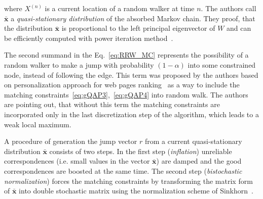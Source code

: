 where $X^{(n)}$ is a current location of a random walker at time $n$. The authors call $\mathbf{\bar{x}}$ a \emph{quasi-stationary distribution} of the absorbed Markov chain. They proof, that the distribution $\mathbf{\bar{x}}$ is proportional to the left principal eigenvector of $W$ and can be efficiently computed with power iteration method~\cite{PowerIteration}.

The second summand in the Eq.~\eqref{eq:RRW_MC} represents the possibility of a random walker to make a jump with probability $(1-\alpha)$ into some constrained node, instead of following the edge. This term was proposed by the authors based on personalization approach for web pages ranking~\cite{Langville2003} as a way to include the matching constraints~\eqref{eq:gQAP3},~\eqref{eq:gQAP4} into random walk. The authors are pointing out, that without this term the matching constraints are incorporated only in the last discretization step of the algorithm, which leads to a weak local maximum. 

A procedure of generation the jump vector $r$ from a current quasi-stationary distribution $\mathbf{\bar{x}}$ consists of two steps. In the first step (\emph{inflation}) unreliable correspondences (i.e. small values in the vector $\mathbf{\bar{x}}$) are damped and the good correspondences are boosted at the same time. The second step (\emph{bistochastic normalization}) forces the matching constraints by transforming the matrix form of $\mathbf{\bar{x}}$ into double stochastic matrix using the normalization scheme of Sinkhorn~\cite{Sinkhorn1964}. 

